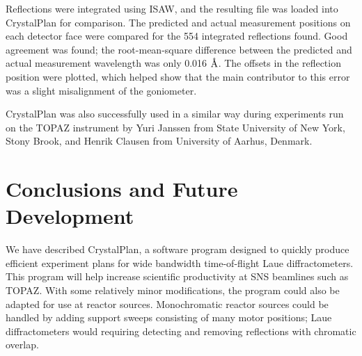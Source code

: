 \documentclass[final]{iucr}              %
\newcommand{\ang}{$\mathrm{\AA} $}
\begin{document}
Reflections were integrated using ISAW, and the resulting file was
loaded into CrystalPlan for comparison. The predicted and actual measurement
positions on each detector face were compared for the 554 integrated reflections
found. Good agreement was found; the root-mean-square difference between the
predicted and actual measurement wavelength was only 0.016 \ang. The offsets in the reflection
position were plotted, which helped show that the main contributor to this error
was a slight misalignment of the goniometer.


CrystalPlan was also successfully used in a similar way during experiments run
on the TOPAZ instrument by Yuri Janssen from State University of New York, Stony
Brook, and Henrik Clausen from University of Aarhus, Denmark. 


\section{Conclusions and Future Development}

We have described CrystalPlan, a software program designed to quickly produce
efficient experiment plans for wide bandwidth time-of-flight Laue
diffractometers. This program will help increase scientific productivity at SNS
beamlines such as TOPAZ. With some relatively minor modifications, the program
could also be adapted for use at reactor sources. Monochromatic reactor sources
could be handled by adding support sweeps consisting of many motor positions;
Laue diffractometers would requiring detecting and removing reflections with chromatic overlap. 
\end{document}
